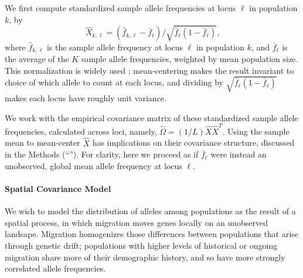 \documentclass[10pt,letterpaper]{article}
\newcommand{\secref}[1]{``\nameref{#1}''}
\begin{document}
We first compute standardized sample allele frequencies at locus $\ell$ in population $k$, by
\begin{equation}
  \label{eq:standardized_sample_freqs}
  \hat{X}_{k,\ell} = (\hat{f}_{k,\ell}  - \bar{f}_{\ell})/\sqrt{\bar{f}_{\ell}(1-\bar{f}_{\ell})}\text{,}
\end{equation}
where $\hat{f}_{k,\ell}$ is the sample allele frequency at locus $\ell$ in population $k$, 
and $\bar{f}_{\ell}$ is the average of the $K$ sample allele frequencies,
weighted by mean population size.
This normalization is widely used \cite{nicholson2002,Patterson2006};
mean-centering makes the result invariant to choice of which allele to count at each locus,
and dividing by $\sqrt{\bar{f}_{\ell}(1-\bar{f}_{\ell})}$ makes each locus have roughly unit variance.

We work with the empirical covariance matrix of these standardized sample allele frequencies,
calculated across loci, namely, $\widehat{\Omega} = (1/L)  \hat{X}\hat{X}^T$.
Using the sample mean to mean-center $\hat X$ has implications on their covariance structure, discussed in the Methods 
(\secref{ss:cov_methods}).
For clarity, here we proceed as if $\bar{f}_{\ell}$ were instead an unobserved, global mean allele frequency at locus $\ell$.

\paragraph{Spatial Covariance Model}
We wish to model the distribution of alleles among populations as the result of a spatial process, 
in which migration moves genes locally on an unobserved landsape.
Migration homogenizes those differences between populations that arise through genetic drift;
populations with higher levels of historical or ongoing migration share more of their demographic history,
and so have more strongly correlated allele frequencies.
\end{document}
